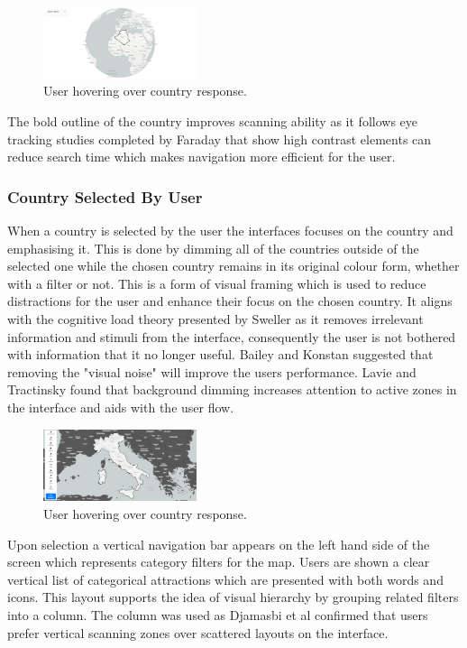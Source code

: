 \documentclass[]{project_final}
\begin{document}
\begin{figure}[ht!]
  \centering
  \includegraphics[width=0.4\textwidth]{8.png}
  \caption{User hovering over country response.}
  \label{fig:1}
\end{figure}

The bold outline of the country improves scanning ability as it follows eye tracking studies completed by Faraday that show high contrast elements can reduce search time which makes navigation more efficient for the user.

\subsubsection{Country Selected By User}
When a country is selected by the user the interfaces focuses on the country and emphasising it. This is done by dimming all of the countries outside of the selected one while the chosen country remains in its original colour form, whether with a filter or not. This is a form of visual framing which is used to reduce distractions for the user and enhance their focus on the chosen country.
It aligns with the cognitive load theory presented by Sweller as it removes irrelevant information and stimuli from the interface, consequently the user is not bothered with information that it no longer useful. Bailey and Konstan suggested that removing the "visual noise" will improve the users performance. Lavie and Tractinsky found that background dimming increases attention to active zones in the interface and aids with the user flow.

\begin{figure}[ht!]
  \centering
  \includegraphics[width=0.4\textwidth]{9.png}
  \caption{User hovering over country response.}
  \label{fig:1}
\end{figure}

Upon selection a vertical navigation bar appears on the left hand side of the screen which represents category filters for the map. Users are shown a clear vertical list of categorical attractions which are presented with both words and icons. This layout supports the idea of visual hierarchy by grouping related filters into a column. The column was used as Djamasbi et al confirmed that users prefer vertical scanning zones over scattered layouts on the interface.
\end{document}
